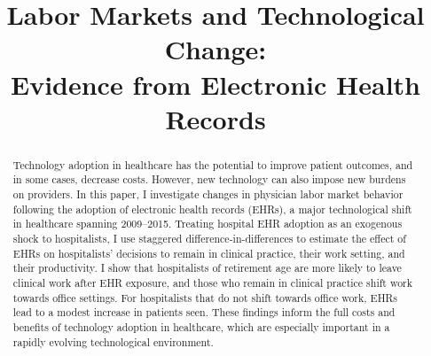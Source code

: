 \documentclass[12pt]{article}
\begin{document}
\linespread{1.2}\title{\vspace{-0.5in} Labor Markets and Technological Change: \\ \Large Evidence from Electronic Health Records%
}  
	
	
    
	
	\maketitle
	
	\vspace{-0.2in}
	
	\singlespacing\maketitle

\begin{abstract}\small
    Technology adoption in healthcare has the potential to improve patient outcomes, and in some cases, decrease costs. However, new technology can also impose new burdens on providers. In this paper, I investigate changes in physician labor market behavior following the adoption of electronic health records (EHRs), a major technological shift in healthcare spanning 2009--2015. Treating hospital EHR adoption as an exogenous shock to hospitalists, I use staggered difference-in-differences to estimate the effect of EHRs on hospitalists' decisions to remain in clinical practice, their work setting, and their productivity. I show that hospitalists of retirement age are more likely to leave clinical work after EHR exposure, and those who remain in clinical practice shift work towards office settings. For hospitalists that do not shift towards office work, EHRs lead to a modest increase in patients seen. These findings inform the full costs and benefits of technology adoption in healthcare, which are especially important in a rapidly evolving technological environment.
\end{abstract}
\end{document}

